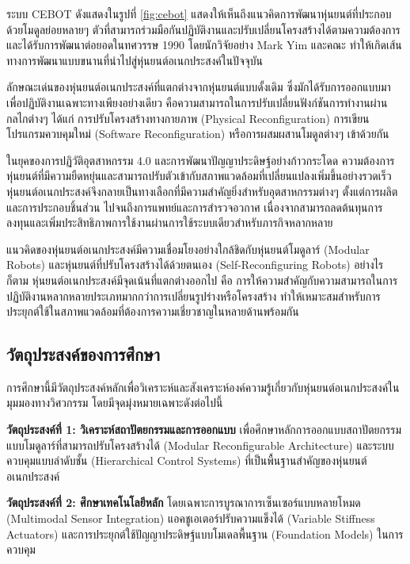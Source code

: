 \documentclass[a4paper]{article}
\begin{document}
ระบบ CEBOT ดังแสดงในรูปที่ \ref{fig:cebot} แสดงให้เห็นถึงแนวคิดการพัฒนาหุ่นยนต์ที่ประกอบด้วยโมดูลย่อยหลายๆ ตัวที่สามารถร่วมมือกันปฏิบัติงานและปรับเปลี่ยนโครงสร้างได้ตามความต้องการ และได้รับการพัฒนาต่อยอดในทศวรรษ 1990 โดยนักวิจัยอย่าง Mark Yim และคณะ \parencite{yim2000modular} ทำให้เกิดเส้นทางการพัฒนาแบบขนานที่นำไปสู่หุ่นยนต์อเนกประสงค์ในปัจจุบัน

ลักษณะเด่นของหุ่นยนต์อเนกประสงค์ที่แตกต่างจากหุ่นยนต์แบบดั้งเดิม ซึ่งมักได้รับการออกแบบมาเพื่อปฏิบัติงานเฉพาะทางเพียงอย่างเดียว คือความสามารถในการปรับเปลี่ยนฟังก์ชันการทำงานผ่านกลไกต่างๆ ได้แก่ การปรับโครงสร้างทางกายภาพ (Physical Reconfiguration) การเขียนโปรแกรมควบคุมใหม่ (Software Reconfiguration) หรือการผสมผสานโมดูลต่างๆ เข้าด้วยกัน \parencite{post2023modular}

ในยุคของการปฏิวัติอุตสาหกรรม 4.0 และการพัฒนาปัญญาประดิษฐ์อย่างก้าวกระโดด ความต้องการหุ่นยนต์ที่มีความยืดหยุ่นและสามารถปรับตัวเข้ากับสภาพแวดล้อมที่เปลี่ยนแปลงเพิ่มขึ้นอย่างรวดเร็ว \parencite{mohammadi2023mobile} หุ่นยนต์อเนกประสงค์จึงกลายเป็นทางเลือกที่มีความสำคัญยิ่งสำหรับอุตสาหกรรมต่างๆ ตั้งแต่การผลิตและการประกอบชิ้นส่วน ไปจนถึงการแพทย์และการสำรวจอวกาศ เนื่องจากสามารถลดต้นทุนการลงทุนและเพิ่มประสิทธิภาพการใช้งานผ่านการใช้ระบบเดียวสำหรับภารกิจหลากหลาย

แนวคิดของหุ่นยนต์อเนกประสงค์มีความเชื่อมโยงอย่างใกล้ชิดกับหุ่นยนต์โมดูลาร์ (Modular Robots) และหุ่นยนต์ที่ปรับโครงสร้างได้ด้วยตนเอง (Self-Reconfiguring Robots) \parencite{seo2019modular} อย่างไรก็ตาม หุ่นยนต์อเนกประสงค์มีจุดเน้นที่แตกต่างออกไป คือ การให้ความสำคัญกับความสามารถในการปฏิบัติงานหลากหลายประเภทมากกว่าการเปลี่ยนรูปร่างหรือโครงสร้าง ทำให้เหมาะสมสำหรับการประยุกต์ใช้ในสภาพแวดล้อมที่ต้องการความเชี่ยวชาญในหลายด้านพร้อมกัน

\subsection{วัตถุประสงค์ของการศึกษา}

การศึกษานี้มีวัตถุประสงค์หลักเพื่อวิเคราะห์และสังเคราะห์องค์ความรู้เกี่ยวกับหุ่นยนต์อเนกประสงค์ในมุมมองทางวิศวกรรม โดยมีจุดมุ่งหมายเฉพาะดังต่อไปนี้

\textbf{วัตถุประสงค์ที่ 1: วิเคราะห์สถาปัตยกรรมและการออกแบบ} เพื่อศึกษาหลักการออกแบบสถาปัตยกรรมแบบโมดูลาร์ที่สามารถปรับโครงสร้างได้ (Modular Reconfigurable Architecture) และระบบควบคุมแบบลำดับชั้น (Hierarchical Control Systems) ที่เป็นพื้นฐานสำคัญของหุ่นยนต์อเนกประสงค์ \parencite{tassi2024multimodal}

\textbf{วัตถุประสงค์ที่ 2: ศึกษาเทคโนโลยีหลัก} โดยเฉพาะการบูรณาการเซ็นเซอร์แบบหลายโหมด (Multimodal Sensor Integration) แอคชูเอเตอร์ปรับความแข็งได้ (Variable Stiffness Actuators) และการประยุกต์ใช้ปัญญาประดิษฐ์แบบโมเดลพื้นฐาน (Foundation Models) ในการควบคุม \parencite{yang2024body}
\end{document}
